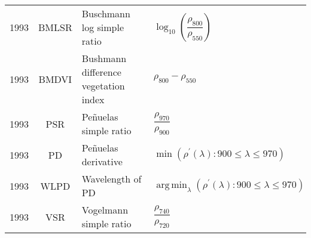 \documentclass[10pt]{article}
\DeclareMathOperator{\argmin}{arg\,min}
\begin{document}
\begin{ThreePartTable}
\begin{longtable}{c c m{2.80in} M{2.80in} M{1.5in}}
  1993 & BMLSR   & Buschmann log simple ratio                                                     & $\log_{10}\left(\dfrac{\rho_{800}}{\rho_{550}}\right)$                                                                                                                                                                                                                                  & \citet{Buschmann1993}                               \\
  1993 & BMDVI   & Bushmann difference vegetation index                                           & $\rho_{800}-\rho_{550}$                                                                                                                                                                                                                                                                 & \citet{Buschmann1993}                               \\
  1993 & PSR     & Pe{\~{n}}uelas simple ratio                                                    & $\dfrac{\rho_{970}}{\rho_{900}}$                                                                                                                                                                                                                                                        & \citet{Penuelas1993}                                \\
  1993 & PD      & Pe{\~{n}}uelas derivative                                                      & $\min(\rho^\prime(\lambda):900\le\lambda\le970)$                                                                                                                                                                                                                                        & \citet{Penuelas1993}                                \\
  1993 & WLPD    & Wavelength of PD                                                               & $\argmin_\lambda (\rho^\prime(\lambda):900\le\lambda\le970)$                                                                                                                                                                                                                            & \citet{Penuelas1993}                                \\
  1993 & VSR     & Vogelmann simple ratio                                                         & $\dfrac{\rho_{740}}{\rho_{720}}$                                                                                                                                                                                                                                                        & \citet{Vogelmann1993}                               \\

\end{longtable}
\end{ThreePartTable}
\end{document}
